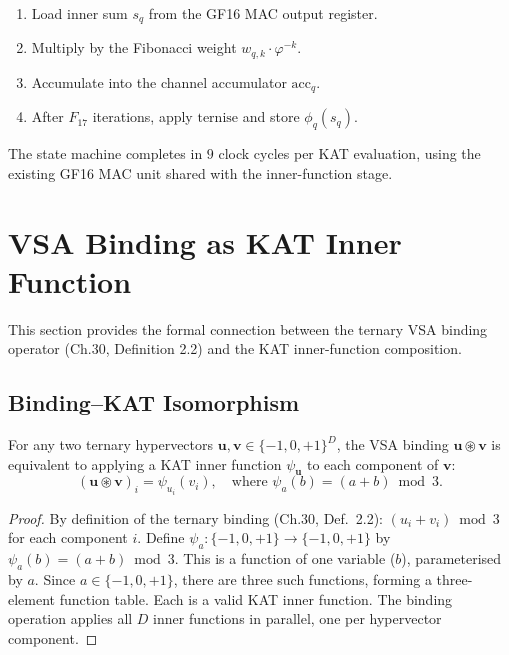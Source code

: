 \begin{enumerate}
\item Load inner sum $s_q$ from the GF16 MAC output register.
\item Multiply by the Fibonacci weight $w_{q,k} \cdot \varphi^{-k}$.
\item Accumulate into the channel accumulator $\mathrm{acc}_q$.
\item After $F_{17}$ iterations, apply $\mathrm{ternise}$ and store
$\phi_q(s_q)$.
\end{enumerate}

The state machine completes in $9$ clock cycles per KAT evaluation,
using the existing GF16 MAC unit shared with the inner-function stage.

\section{VSA Binding as KAT Inner Function}
\label{app:G-vsa-binding}

This section provides the formal connection between the ternary VSA
binding operator (Ch.30, Definition 2.2) and the KAT inner-function
composition.

\subsection{Binding--KAT Isomorphism}

\begin{proposition}
\label{prop:G-binding-kat}
For any two ternary hypervectors
$\mathbf{u}, \mathbf{v} \in \{-1, 0, +1\}^D$, the VSA binding
$\mathbf{u} \circledast \mathbf{v}$ is equivalent to applying a
KAT inner function $\psi_{\mathbf{u}}$ to each component of
$\mathbf{v}$:
\[
(\mathbf{u} \circledast \mathbf{v})_i = \psi_{u_i}(v_i),
\quad \text{where } \psi_a(b) = (a + b) \bmod 3.
\]
\end{proposition}

\begin{proof}
By definition of the ternary binding (Ch.30, Def.~2.2):
$(u_i + v_i) \bmod 3$ for each component $i$. Define
$\psi_a\colon \{-1,0,+1\} \to \{-1,0,+1\}$ by $\psi_a(b) = (a+b)
\bmod 3$. This is a function of one variable ($b$), parameterised by
$a$. Since $a \in \{-1, 0, +1\}$, there are three such functions,
forming a three-element function table. Each is a valid KAT inner
function. The binding operation applies all $D$ inner functions in
parallel, one per hypervector component.
\end{proof}

